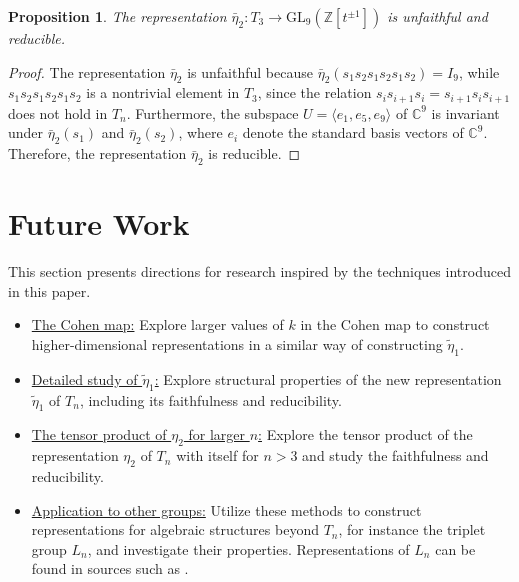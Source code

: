 \documentclass[reqno]{amsart}
\newtheorem{proposition}[theorem]{Proposition}
\begin{document}
\begin{proposition}
The representation $\bar{\eta}_2:T_3 \longrightarrow \mathrm{GL}_9(\mathbb{Z}[t^{\pm 1}])$ is unfaithful and reducible.
\end{proposition}

\begin{proof}
The representation $\bar{\eta}_2$ is unfaithful because $\bar{\eta}_2(s_1s_2s_1s_2s_1s_2) = I_9$, while $s_1s_2s_1s_2s_1s_2$ is a nontrivial element in $T_3$, since the relation $s_i s_{i+1} s_i = s_{i+1} s_i s_{i+1}$ does not hold in $T_n$. Furthermore, the subspace $U = \langle e_1, e_5, e_9 \rangle$ of $\mathbb{C}^9$ is invariant under $\bar{\eta}_2(s_1)$ and $\bar{\eta}_2(s_2)$, where $e_i$ denote the standard basis vectors of $\mathbb{C}^9$. Therefore, the representation $\bar{\eta}_2$ is reducible.
\end{proof}

\section{Future Work}

This section presents directions for research inspired by the techniques introduced in this paper.
\begin{itemize}
    \item[(F1)] \underline{ The Cohen map:} Explore larger values of $k$ in the Cohen map to construct higher-dimensional representations in a similar way of constructing $\widetilde{\eta}_1$.\vspace{0.1cm}
    \item[(F2)] \underline{Detailed study of $\widetilde{\eta}_1$:} Explore structural properties of the new representation $\widetilde{\eta}_1$ of $T_n$, including its faithfulness and reducibility.\vspace{0.1cm}
    \item[(F3)] \underline{The tensor product of $\eta_2$ for larger \(n\):} Explore the tensor product of the representation $\eta_2$ of $T_n$ with itself for $n>3$ and study the faithfulness and reducibility.
    \vspace{0.1cm}
    \item[(F4)] \underline{Application to other groups:} Utilize these methods to construct representations for algebraic structures beyond $T_n$, for instance the triplet group $L_n$, and investigate their properties. Representations of $L_n$ can be found in sources such as \cite{PKumar2024,Nasser2026}.
\end{itemize}
\end{document}
